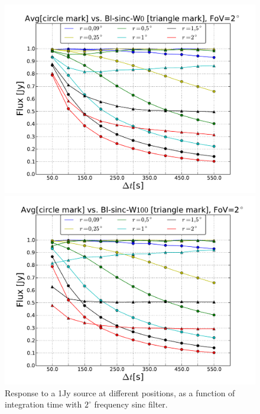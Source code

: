 \documentclass[useAMS,usenatbib]{mn2e}
\begin{document}
\begin{figure}
  \centering
\begin{minipage}{0.36\linewidth}\includegraphics[width=1.\textwidth]{./Figures/max-integ-time-sinc-w1x1-fov2.pdf}
	\caption{Response to a 1Jy source at different positions, as a function of integration time with $2^{\circ}$ frequency sinc filter.}
	\label{fig:max-integ-time-sinc-w1x1-fov2}
	\end{minipage} \hspace{1cm}
\begin{minipage}{0.36\linewidth}\includegraphics[width=1.\textwidth]{./Figures/max-integ-time-sinc-w100x1-fov2.pdf}

\end{minipage}
\end{figure}
\end{document}
